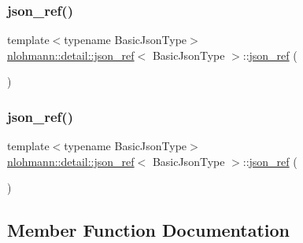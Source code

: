 \subsubsection{\texorpdfstring{json\+\_\+ref()}{json\_ref()}\hspace{0.1cm}{\footnotesize\ttfamily [5/6]}}
{\footnotesize\ttfamily template$<$typename Basic\+Json\+Type$>$ \\
\hyperlink{classnlohmann_1_1detail_1_1json__ref}{nlohmann\+::detail\+::json\+\_\+ref}$<$ Basic\+Json\+Type $>$\+::\hyperlink{classnlohmann_1_1detail_1_1json__ref}{json\+\_\+ref} (\begin{DoxyParamCaption}\item[{\hyperlink{classnlohmann_1_1detail_1_1json__ref}{json\+\_\+ref}$<$ Basic\+Json\+Type $>$ \&\&}]{ }\end{DoxyParamCaption})\hspace{0.3cm}{\ttfamily [default]}}

\mbox{\label{classnlohmann_1_1detail_1_1json__ref_a4c68db46934e03588bbd73b00147c0dd}} 
\subsubsection{\texorpdfstring{json\+\_\+ref()}{json\_ref()}\hspace{0.1cm}{\footnotesize\ttfamily [6/6]}}
{\footnotesize\ttfamily template$<$typename Basic\+Json\+Type$>$ \\
\hyperlink{classnlohmann_1_1detail_1_1json__ref}{nlohmann\+::detail\+::json\+\_\+ref}$<$ Basic\+Json\+Type $>$\+::\hyperlink{classnlohmann_1_1detail_1_1json__ref}{json\+\_\+ref} (\begin{DoxyParamCaption}\item[{const \hyperlink{classnlohmann_1_1detail_1_1json__ref}{json\+\_\+ref}$<$ Basic\+Json\+Type $>$ \&}]{ }\end{DoxyParamCaption})\hspace{0.3cm}{\ttfamily [delete]}}



\subsection{Member Function Documentation}
\mbox{\label{classnlohmann_1_1detail_1_1json__ref_ae39e523218bf05cac3fb5b5b1cd5efb6}} 
